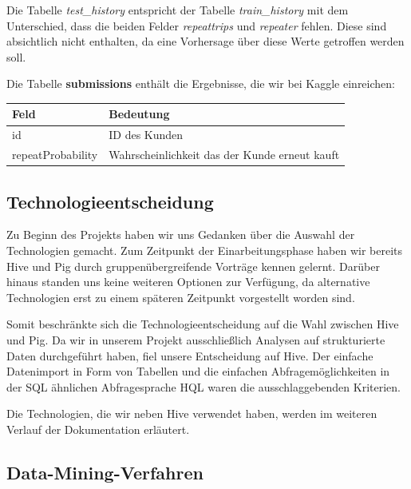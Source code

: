 Die Tabelle \textit{test\_history} entspricht der Tabelle \textit{train\_history} mit dem Unterschied, dass die beiden Felder \textit{repeattrips} und \textit{repeater} fehlen. Diese sind absichtlich nicht enthalten, da eine Vorhersage über diese Werte getroffen werden soll.


Die Tabelle \textbf{submissions} enthält die Ergebnisse, die wir bei Kaggle einreichen:\\
\begin{tabular}{|l|l|}
	\hline \textbf{Feld} & \textbf{Bedeutung}  \\ 
	\hline id & ID des Kunden \\ 
	\hline repeatProbability & Wahrscheinlichkeit das der Kunde erneut kauft \\ 
	\hline 
\end{tabular} 




\subsection{Technologieentscheidung}
Zu Beginn des Projekts haben wir uns Gedanken über die Auswahl der Technologien gemacht. Zum Zeitpunkt der Einarbeitungsphase haben wir bereits Hive und Pig durch gruppenübergreifende Vorträge kennen gelernt. Darüber hinaus standen uns keine weiteren Optionen zur Verfügung, da alternative Technologien erst zu einem späteren Zeitpunkt vorgestellt worden sind.

Somit beschränkte sich die Technologieentscheidung auf die Wahl zwischen Hive und Pig. Da wir in unserem Projekt ausschließlich Analysen auf strukturierte Daten durchgeführt haben, fiel unsere Entscheidung auf Hive. Der einfache Datenimport in Form von Tabellen und die einfachen Abfragemöglichkeiten in der SQL ähnlichen Abfragesprache HQL waren die ausschlaggebenden Kriterien.

Die Technologien, die wir neben Hive verwendet haben, werden im weiteren Verlauf der Dokumentation erläutert.


\subsection{Data-Mining-Verfahren}
